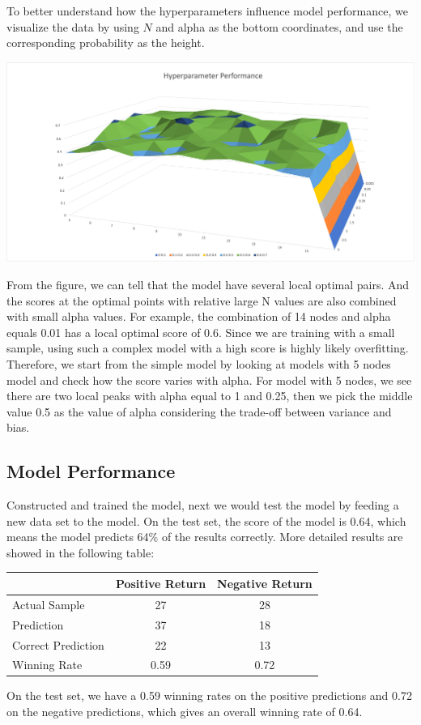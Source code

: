 \documentclass{article}
\begin{document}
To better understand how the hyperparameters influence model performance, we visualize the data by using $N$ and alpha as the bottom coordinates, and use the corresponding probability as the height.
\begin{center}
\includegraphics[scale=0.4]{hyperparameter_performance.png}
\end{center}
From the figure, we can tell that the model have several local optimal pairs. And the scores at the optimal points with relative large N values are also combined with small alpha values. For example, the combination of 14 nodes and alpha equals 0.01 has a local optimal score of 0.6. Since we are training with a small sample, using such a complex model with a high score is highly likely overfitting. Therefore, we start from the simple model by looking at models with 5 nodes model and check how the score varies with alpha. For model with 5 nodes, we see there are two local peaks with alpha equal to 1 and 0.25, then we pick the middle value 0.5 as the value of alpha considering the trade-off between variance and bias. 

\subsection{Model Performance}
Constructed and trained the model, next we would test the model by feeding a new data set to the model. On the test set, the score of the model is 0.64, which means the model predicts 64$\%$ of the results correctly. More detailed results are showed in the following table:

\begin{table}[!ht]
    \centering
    \begin{tabular}{|l|c|c|}
    \hline
        ~ & Positive Return& Negative Return\\ \hline
        Actual Sample & 27 & 28 \\ \hline
        Prediction & 37 & 18 \\ \hline
        Correct Prediction & 22 & 13 \\ \hline
        Winning Rate & 0.59 & 0.72 \\ \hline
    \end{tabular}
\end{table}
On the test set, we have a 0.59 winning rates on the positive predictions and 0.72 on the negative predictions, which gives an overall winning rate of 0.64.
\end{document}
